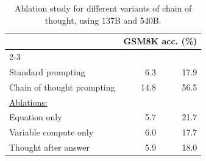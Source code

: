 \newcommand{\cell}[2]{#1{ \scriptsize $\pm$#2}}
\newcommand{\rcell}[2]{{#1}{ \scriptsize $\pm$#2}}
\newcommand{\gcell}[2]{{#1}{ \scriptsize $\pm$#2}}

\begin{table}[t]
    \caption{
    Ablation study for different variants of chain of thought, using \lamda{} 137B and \palm{} 540B. 
    }
    \small
    \centering
    \begin{tabular}{lrr}
        \toprule
          & \multicolumn{2}{c}{GSM8K acc. (\%)}  \\
          \cmidrule(lr){2-3}
          & \lamda{} & \palm{} \\
         \hline
         Standard prompting & 6.3 & 17.9 \\
         Chain of thought prompting & 14.8 & 56.5\\
         \underline{Ablations:}   \\
         \hspace{1mm} Equation only & 5.7 & 21.7 \\
         \hspace{1mm} Variable compute only & 6.0 & 17.7 \\
         \hspace{1mm} Thought after answer & 5.9 & 18.0 \\
         \bottomrule
    \end{tabular}
    \label{tab:math-ablation}
    \vspace{-4mm}
\end{table}